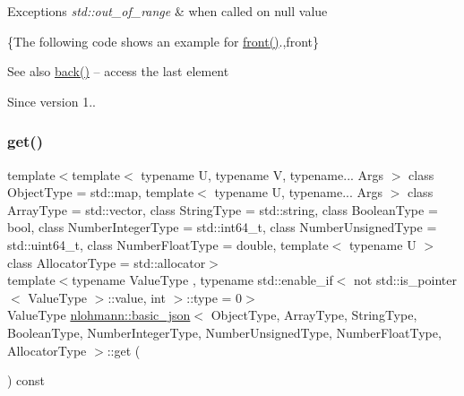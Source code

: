 \begin{DoxyExceptions}{Exceptions}
{\em std\+::out\+\_\+of\+\_\+range} & when called on {\ttfamily null} value\\
\hline
\end{DoxyExceptions}
\{The following code shows an example for {\ttfamily \hyperlink{classnlohmann_1_1basic__json_aa45753034bea87f9d2c0c42ace9ff75c}{front()}}.,front\}

\begin{DoxySeeAlso}{See also}
\hyperlink{classnlohmann_1_1basic__json_a71b1d38ef402dfee58fba1fe01fa67f5}{back()} -- access the last element
\end{DoxySeeAlso}
\begin{DoxySince}{Since}
version 1.. 
\end{DoxySince}
\hypertarget{classnlohmann_1_1basic__json_aba0695744dbcdad65825f91768a8f04f}{}\label{classnlohmann_1_1basic__json_aba0695744dbcdad65825f91768a8f04f} 
\subsubsection{\texorpdfstring{get()}{get()}\hspace{0.1cm}{\footnotesize\ttfamily [1/3]}}
{\footnotesize\ttfamily template$<$template$<$ typename U, typename V, typename... Args $>$ class Object\+Type = std\+::map, template$<$ typename U, typename... Args $>$ class Array\+Type = std\+::vector, class String\+Type  = std\+::string, class Boolean\+Type  = bool, class Number\+Integer\+Type  = std\+::int64\+\_\+t, class Number\+Unsigned\+Type  = std\+::uint64\+\_\+t, class Number\+Float\+Type  = double, template$<$ typename U $>$ class Allocator\+Type = std\+::allocator$>$ \\
template$<$typename Value\+Type , typename std\+::enable\+\_\+if$<$ not std\+::is\+\_\+pointer$<$ Value\+Type $>$\+::value, int $>$\+::type  = 0$>$ \\
Value\+Type \hyperlink{classnlohmann_1_1basic__json}{nlohmann\+::basic\+\_\+json}$<$ Object\+Type, Array\+Type, String\+Type, Boolean\+Type, Number\+Integer\+Type, Number\+Unsigned\+Type, Number\+Float\+Type, Allocator\+Type $>$\+::get (\begin{DoxyParamCaption}{ }\end{DoxyParamCaption}) const\hspace{0.3cm}{\ttfamily [inline]}}



